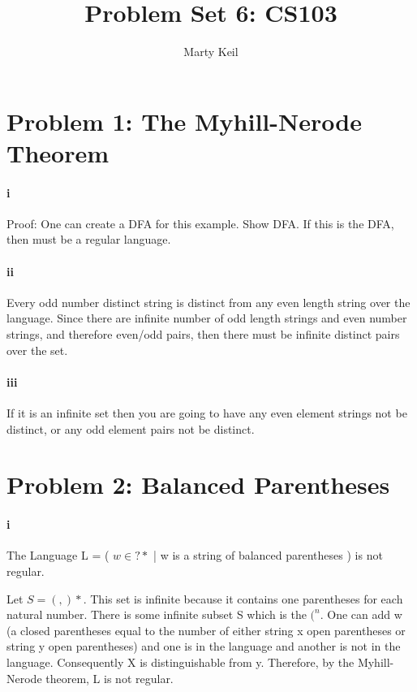 \documentclass[10pt,letter]{article}
\begin{document}

\title{Problem Set 6: CS103}

\author{Marty Keil}

 
\maketitle

\section*{Problem 1: The Myhill-Nerode Theorem}
\paragraph{i}
Proof: One can create a DFA for this example. Show DFA. If this is the DFA, then must be a regular language. 

\paragraph{ii}
Every odd number distinct string is distinct from any even length string over the language. Since there are infinite number of odd length strings and even number strings, and therefore even/odd pairs, then there must be infinite distinct pairs over the set. 

\paragraph{iii}
If it is an infinite set then you are going to have any even element strings not be distinct, or any odd element pairs not be distinct. 

\section*{Problem 2: Balanced Parentheses}
\paragraph{i}
\thm The Language L = ( $w \in ?*$ | w is a string of balanced parentheses ) is not regular. 

\proof Let $S = (,)*.$ This set is infinite because it contains one parentheses for each natural number. There is some infinite subset S which is the $(^n$. One can add w (a closed parentheses equal to the number of either string x open parentheses or string y open parentheses) and one is in the language and another is not in the language.  Consequently X is distinguishable from y. Therefore, by the Myhill-Nerode theorem, L is not regular. 
\end{document}
